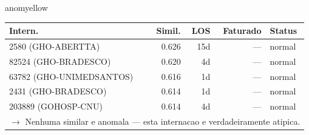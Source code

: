 \documentclass[a4paper,10pt]{article}
\begin{document}
\begin{anomalycard}[Internacao 118019 | GHO-BRADESCO | MODERADO (z=2.13)]{anomyellow}
\begin{tabular}{l r r r l}\toprule\textbf{Intern.} & \textbf{Simil.} & \textbf{LOS} & \textbf{Faturado} & \textbf{Status} \\\midrule
2580 (GHO-ABERTTA) & 0.626 & 15d & --- & \textcolor{jcubeblue}{normal} \\
82524 (GHO-BRADESCO) & 0.620 & 4d & --- & \textcolor{jcubeblue}{normal} \\
63782 (GHO-UNIMEDSANTOS) & 0.616 & 1d & --- & \textcolor{jcubeblue}{normal} \\
2431 (GHO-BRADESCO) & 0.614 & 1d & --- & \textcolor{jcubeblue}{normal} \\
203889 (GOHOSP-CNU) & 0.614 & 4d & --- & \textcolor{jcubeblue}{normal} \\
\multicolumn{5}{l}{\textcolor{jcubeblue}{\small $\rightarrow$ Nenhuma similar e anomala --- esta internacao e verdadeiramente atipica.}} \\
\bottomrule\end{tabular}



\end{anomalycard}

\newpage
\end{document}
